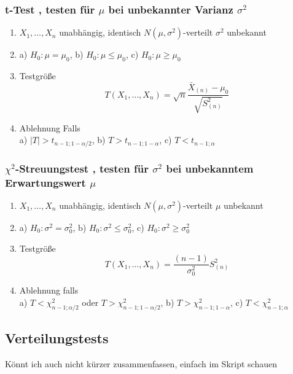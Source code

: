 \documentclass[
	ngerman,
	accentcolor=9c,%
	type=intern,
	marginpar=false
	]{tudapub}
\begin{document}
                \subsubsection*{t-Test , testen für $\mu$ bei unbekannter Varianz $\sigma^2$}
                     \begin{enumerate}
                         \item $X_1,\dots,X_n$ unabhängig, identisch $N(\mu, \sigma^2)$-verteilt $\sigma^2$ unbekannt
                         \item a) $H_0: \mu = \mu_0$, b) $H_0: \mu \leq \mu_0$, c) $H_0: \mu \geq \mu_0$     
                         \item Testgröße
                         \begin{equation*}
                             T(X_1,\dots,X_n)=\sqrt{n}\dfrac{\bar{X}_{(n)}-\mu_0}{\sqrt{S_{(n)}^2}}
                         \end{equation*} 
                         \item Ablehnung Falls\\
                               a) $|T| > t_{n-1;1-\alpha/2}$, b) $T > t_{n-1;1-\alpha}$, c) $T < t_{n-1;\alpha}$
                     \end{enumerate}
                \subsubsection*{$\chi^2$-Streuungstest , testen für $\sigma^2$ bei unbekanntem Erwartungswert $\mu$}
                    \begin{enumerate}
                        \item $X_1,\dots,X_n$ unabhängig, identisch $N(\mu, \sigma^2)$-verteilt $\mu$ unbekannt
                        \item a) $H_0: \sigma^2 = \sigma^2_0$, b) $H_0: \sigma^2 \leq \sigma^2_0$, c) $H_0: \sigma^2 \geq \sigma^2_0$
                        \item Testgröße
                        \begin{equation*}
                            T(X_1,\dots,X_n)=\dfrac{(n-1)}{\sigma^2_0}S^2_{(n)}
                        \end{equation*}
                        \item Ablehnung falls\\
                        a) $T<\chi^2_{n-1;\alpha/2}$ oder $T>\chi^2_{n-1;1-\alpha/2}$, 
                        b) $T>\chi^2_{n-1;1-\alpha}$, 
                        c) $T<\chi^2_{n-1;\alpha}$
                    \end{enumerate}
            \subsection{Verteilungstests}
                Könnt ich auch nicht kürzer zusammenfassen, einfach im Skript schauen
\end{document}
